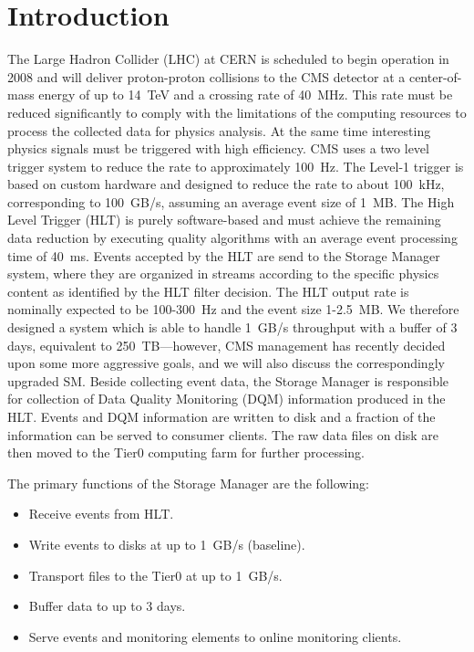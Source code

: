 
\section{\label{sec:intro}Introduction}

The Large Hadron Collider (LHC) at CERN is scheduled to begin operation in 2008 
and will deliver proton-proton collisions to the CMS detector at a center-of-mass energy 
of up to 14~TeV and a crossing rate of 40~MHz. 
This rate must be reduced significantly to comply with the limitations of the computing resources to process the collected data for physics analysis. 
At the same time interesting physics signals must be triggered with high efficiency. 
CMS uses a two level trigger system to reduce the rate to approximately 100~Hz. 
The Level-1 trigger is based on custom hardware and designed to reduce the rate to about 100~kHz, corresponding to 100~GB/s, assuming an average event size of 1~MB. 
The High Level Trigger (HLT) is purely software-based and  must achieve the remaining data reduction by executing quality algorithms with an average event processing time of 40~ms. 
Events accepted by the HLT are send to the Storage Manager system, where they are organized in streams according to the specific physics content as identified by the HLT filter decision. 
The HLT output rate is nominally expected to be 100-300~Hz and the event size 1-2.5~MB. 
We therefore designed a system which is able to handle 1~GB/s throughput with a buffer of 3 days, 
equivalent to 250~TB---however, CMS management has recently decided upon some more aggressive goals,
and we will also discuss the correspondingly upgraded SM. 
Beside collecting event data, the Storage Manager is responsible for collection of Data Quality Monitoring (DQM) information produced in the HLT. 
Events and DQM information are written to disk and a fraction of the information can be served to consumer clients. 
The raw data files on disk are then moved to the Tier0 computing farm for further processing. 

The primary functions of the Storage Manager are the following:
\begin{itemize}
\item Receive events from HLT.
\item Write events to disks at up to 1~GB/s (baseline).
\item Transport files to the Tier0 at up to 1~GB/s.
\item Buffer data to up to 3 days.
\item Serve events and monitoring elements to online monitoring clients.
\end{itemize}
